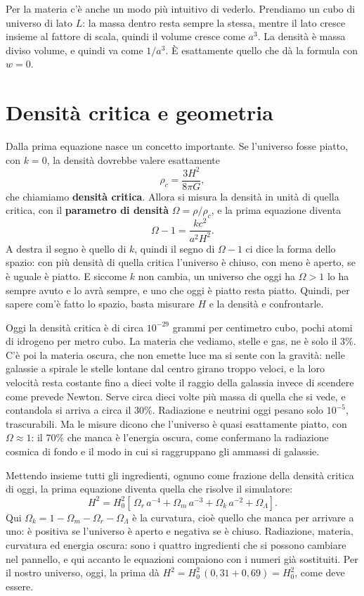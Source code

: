\documentclass[12pt,a4paper]{article}
\begin{document}
Per la materia c'è anche un modo più intuitivo di vederlo. Prendiamo un cubo di universo di lato $L$: la massa dentro resta sempre la stessa, mentre il lato cresce insieme al fattore di scala, quindi il volume cresce come $a^3$. La densità è massa diviso volume, e quindi va come $1/a^3$. È esattamente quello che dà la formula con $w = 0$.

\section{Densità critica e geometria}
Dalla prima equazione nasce un concetto importante. Se l'universo fosse piatto, con $k = 0$, la densità dovrebbe valere esattamente
\[ \rho_c = \frac{3H^2}{8\pi G} , \]
che chiamiamo \textbf{densità critica}. Allora si misura la densità in unità di quella critica, con il \textbf{parametro di densità} $\Omega = \rho/\rho_c$, e la prima equazione diventa
\[ \Omega - 1 = \frac{k c^2}{a^2 H^2} . \]
A destra il segno è quello di $k$, quindi il segno di $\Omega - 1$ ci dice la forma dello spazio: con più densità di quella critica l'universo è chiuso, con meno è aperto, se è uguale è piatto. E siccome $k$ non cambia, un universo che oggi ha $\Omega > 1$ lo ha sempre avuto e lo avrà sempre, e uno che oggi è piatto resta piatto. Quindi, per sapere com'è fatto lo spazio, basta misurare $H$ e la densità e confrontarle.

Oggi la densità critica è di circa $10^{-29}$ grammi per centimetro cubo, pochi atomi di idrogeno per metro cubo. La materia che vediamo, stelle e gas, ne è solo il 3\%. C'è poi la materia oscura, che non emette luce ma si sente con la gravità: nelle galassie a spirale le stelle lontane dal centro girano troppo veloci, e la loro velocità resta costante fino a dieci volte il raggio della galassia invece di scendere come prevede Newton. Serve circa dieci volte più massa di quella che si vede, e contandola si arriva a circa il 30\%. Radiazione e neutrini oggi pesano solo $10^{-5}$, trascurabili. Ma le misure dicono che l'universo è quasi esattamente piatto, con $\Omega \approx 1$: il 70\% che manca è l'energia oscura, come confermano la radiazione cosmica di fondo e il modo in cui si raggruppano gli ammassi di galassie.

Mettendo insieme tutti gli ingredienti, ognuno come frazione della densità critica di oggi, la prima equazione diventa quella che risolve il simulatore:
\[ H^2 = H_0^2 \left[\,\Omega_r\, a^{-4} + \Omega_m\, a^{-3} + \Omega_k\, a^{-2} + \Omega_\Lambda \right]. \]
Qui $\Omega_k = 1 - \Omega_m - \Omega_r - \Omega_\Lambda$ è la curvatura, cioè quello che manca per arrivare a uno: è positiva se l'universo è aperto e negativa se è chiuso. Radiazione, materia, curvatura ed energia oscura: sono i quattro ingredienti che si possono cambiare nel pannello, e qui accanto le equazioni compaiono con i numeri già sostituiti. Per il nostro universo, oggi, la prima dà $H^2 = H_0^2\,(0{,}31 + 0{,}69) = H_0^2$, come deve essere.
\end{document}
